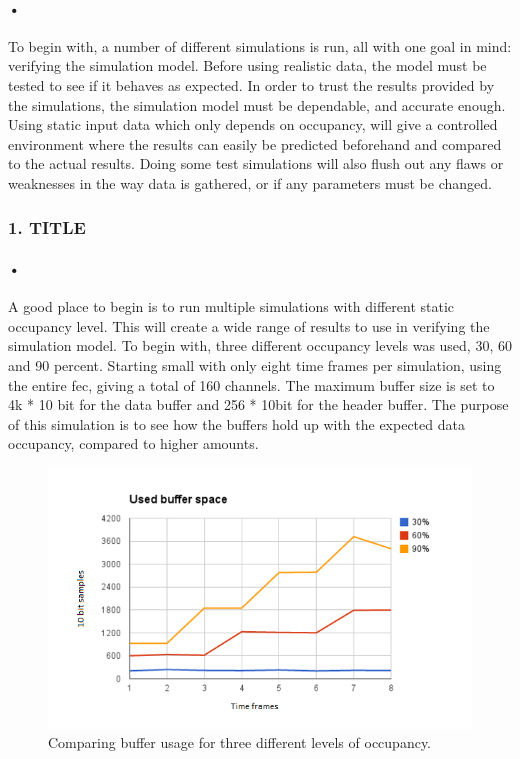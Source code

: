 \documentclass[a4paper, 12pt]{report}\dfrac{\right }{•}
\begin{document}
\paragraph{•}
To begin with, a number of different simulations is run, all with one goal in mind: verifying the simulation model.
Before using realistic data, the model must be tested to see if it behaves as expected.
In order to trust the results provided by the simulations, the simulation model must be dependable, and accurate enough.
Using static input data which only depends on occupancy, will give a controlled environment where the results can easily be predicted beforehand and compared to the actual results.
Doing some test simulations will also flush out any flaws or weaknesses in the way data is gathered, or if any parameters must be changed.

\subsubsection{1. TITLE}
\paragraph{•}
A good place to begin is to run multiple simulations with different static occupancy level.
This will create a wide range of results to use in verifying the simulation model.
To begin with, three different occupancy levels was used, 30, 60 and 90 percent.
Starting small with only eight time frames per simulation, using the entire \gls{fec}, giving a total of 160 channels.
The maximum buffer size is set to 4k * 10 bit for the data buffer and 256 * 10bit for the header buffer.
The purpose of this simulation is to see how the buffers hold up with the expected data occupancy, compared to higher amounts.

\begin{figure}[h!]
	\centering
		\includegraphics[width=1.0\textwidth]{images/results-flat30-60-80-8tf.png}
		\caption{Comparing buffer usage for three different levels of occupancy.}
		\label{fig:results-30-60-90}
\end{figure}
\end{document}
